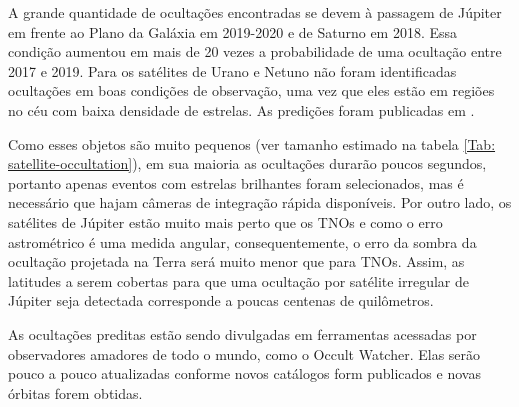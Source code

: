 \documentclass[12pt,a4paper]{report}
\begin{document}
A grande quantidade de ocultações encontradas se devem à passagem de Júpiter em frente ao Plano da Galáxia em 2019-2020 e de Saturno em 2018. Essa condição aumentou em mais de 20 vezes a probabilidade de uma ocultação entre 2017 e 2019. Para os satélites de Urano e Netuno não foram identificadas ocultações em boas condições de observação, uma vez que eles estão em regiões no céu com baixa densidade de estrelas. As predições foram publicadas em \cite{GomesJunior2016}.

Como esses objetos são muito pequenos (ver tamanho estimado na tabela \ref{Tab: satellite-occultation}), em sua maioria as ocultações durarão poucos segundos, portanto apenas eventos com estrelas brilhantes foram selecionados, mas é necessário que hajam câmeras de integração rápida disponíveis. Por outro lado, os satélites de Júpiter estão muito mais perto que os TNOs e como o erro astrométrico é uma medida angular, consequentemente, o erro da sombra da ocultação projetada na Terra será muito menor que para TNOs. Assim, as latitudes a serem cobertas para que uma ocultação por satélite irregular de Júpiter seja detectada corresponde a poucas centenas de quilômetros.

As ocultações preditas estão sendo divulgadas em ferramentas acessadas por observadores amadores de todo o mundo, como o Occult Watcher. Elas serão pouco a pouco atualizadas conforme novos catálogos form publicados e novas órbitas forem obtidas.
\end{document}
